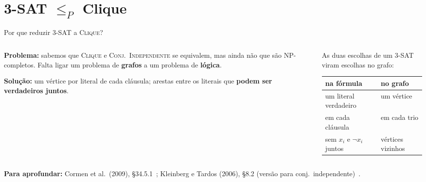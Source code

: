 \documentclass[aspectratio=169,xcolor=table]{beamer}
\newcommand{\fonte}[1]{%
  \vfill
  {\tiny\color{gray!55!black}\textbf{Para aprofundar:} #1\par}%
}
\newcommand{\prob}[1]{\textsc{#1}}
\newcommand{\nao}{\lnot}
\begin{document}
\section{3-SAT $\le_P$ Clique}

\begin{frame}{Por que reduzir \prob{3-SAT} a \prob{Clique}?}
  \begin{columns}[T]
    \begin{column}{0.5\textwidth}
      \small
      \textbf{Problema:} sabemos que \prob{Clique} e \prob{Conj.\ Independente} se equivalem,
      mas ainda não que são NP-completos. Falta ligar um problema de \textbf{grafos} a um
      problema de \textbf{lógica}.
      \medskip

      \textbf{Solução:} um vértice por literal de cada cláusula; arestas entre os literais que
      \textbf{podem ser verdadeiros juntos}.
    \end{column}
    \begin{column}{0.46\textwidth}
      \scriptsize
      As duas escolhas de um 3-SAT viram escolhas no grafo:
      \medskip

      \begin{tabular}{ll}
        \toprule
        na fórmula & no grafo \\
        \midrule
        um literal verdadeiro & um vértice \\
        \quad em cada cláusula & \quad em cada trio \\
        sem $x_i$ e $\nao x_i$ juntos & vértices vizinhos \\
        \bottomrule
      \end{tabular}
    \end{column}
  \end{columns}
  \fonte{Cormen et al.\ (2009), \S 34.5.1~\cite{cormen2009introduction};
    Kleinberg e Tardos (2006), \S 8.2 (versão para conj.\ independente)~\cite{kleinberg2006algorithm}.}
\end{frame}
\end{document}
